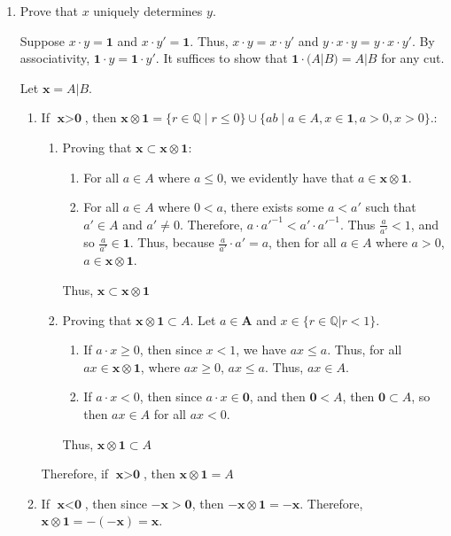 \documentclass[11pt]{article}
\newcommand{\bbQ}{\mathbb{Q}}
\begin{document}
\begin{enumerate}
\begin{solution}
    \end{solution}
    \item 
    \begin{problem}
    Prove that $x$ uniquely determines $y.$
    \end{problem}
    \begin{solution}
        Suppose $x\cdot y = \textbf{1}$ and $x\cdot y' = \textbf{1}.$ Thus, $x \cdot y = x\cdot y'$ and $y \cdot x \cdot y = y \cdot x\cdot y'.$ By associativity, $\textbf{1} \cdot y = \textbf{1}\cdot y'.$ It suffices to show that $\textbf{1}\cdot (A | B) = A | B$ for any cut. 
        \begin{prop} Let $\textbf{x} = A | B.$
            \begin{enumerate}
    \item If $\textbf{x}>\textbf{0}$, then $\textbf{x}\otimes \textbf{1} = \{r \in \bbQ \mid r \leq 0\} \cup \{ab \mid a\in A, x\in \textbf{1}, a > 0, x > 0\}.$:
    \begin{enumerate}
        \item Proving that $\textbf{x}\subset \textbf{x} \otimes \textbf{1}$:
        \begin{enumerate}
            \item For all $a\in A$ where $a\leq 0$, we evidently have that $a\in \textbf{x}\otimes \textbf{1}.$ 
            \item For all $a\in A$ where $0<a$, there exists some $a<a'$ such that $a'\in A$ and $a'\neq 0$. Therefore, $a\cdot a'^{-1}<a'\cdot a'^{-1}$. Thus $\frac{a}{a'}<1$, and so $\frac{a}{a'}\in \textbf{1}$. Thus, because $\frac{a}{a'}\cdot a' = a$, then for all $a\in A$ where $a>0$, $a\in \textbf{x}\otimes \textbf{1}$.
        \end{enumerate}
        Thus, $\textbf{x}\subset \textbf{x} \otimes \textbf{1}$
        \item Proving that $ \textbf{x} \otimes \textbf{1}\subset A$. Let $a\in \textbf{A}$ and $x\in \{r\in \bbQ | r<1\}.$
        \begin{enumerate}
            \item If $a\cdot x \geq 0$, then since $x<1$, we have $ax\leq a$. Thus, for all $ax\in \textbf{x}\otimes \textbf{1}$, where $ax\geq 0$, $ax\leq a$. Thus, $ax\in A$.
            \item If $a\cdot x< 0$, then since $a\cdot x \in \textbf{0}$, and then $\textbf{0}<A$, then $\textbf{0}\subset A$, so then $ax\in A$ for all $ax<0$.
        \end{enumerate}
        Thus, $\textbf{x}\otimes \textbf{1} \subset A$
\end{enumerate}
Therefore, if $\textbf{x}>\textbf{0}$, then $\textbf{x}\otimes \textbf{1} = A$
\item If $\textbf{x}<\textbf{0}$, then since $-\textbf{x}>\textbf{0}$, then $-\textbf{x} \otimes \textbf{1} = -\textbf{x}$. Therefore, $\textbf{x} \otimes \textbf{1} = -(-\textbf{x}) = \textbf{x}$.
\end{enumerate}
        \end{prop}
    \end{solution}
\end{enumerate}
\newpage
\end{document}
